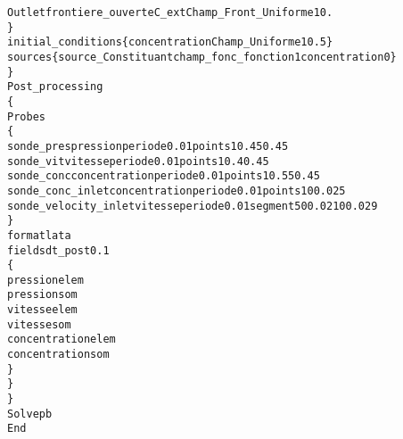 \begin{alltt}
            Outlet  frontiere_ouverte C_ext Champ_Front_Uniforme 1 0.
        \}
        initial_conditions \{ concentration Champ_Uniforme 1 0.5 \}
        sources \{ source_Constituant champ_fonc_fonction 1 concentration 0 \}
    \}
    Post_processing
    \{
        Probes
        \{
            sonde_pres pression periode 0.01 points 1 0.45 0.45
            sonde_vit  vitesse periode 0.01 points 1 0.4 0.45
            sonde_conc concentration periode 0.01 points 1 0.55 0.45
            sonde_conc_inlet     concentration periode 0.01 points 1 0 0.025
            sonde_velocity_inlet vitesse periode 0.01 segment 5 0 0.021 0 0.029
        \}
        format lata
        fields dt_post 0.1
        \{
            pression elem
            pression som
            vitesse elem
            vitesse som
            concentration elem
            concentration som
        \}
    \}
\}
Solve pb
End
\end{alltt}
